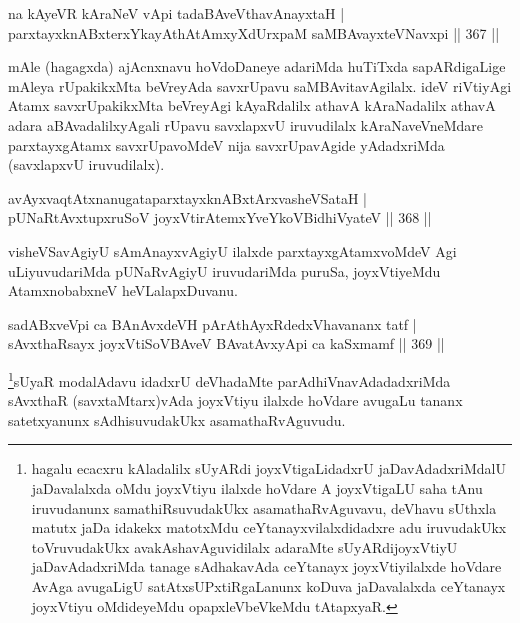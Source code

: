 \begin{shl}
na kAyeVR kAraNeV vA\s pi tadaBAveV\s thavA\s nayxtaH | \\
parxtayxknABxterxYkayAthAtAmxyXdUrxpaM saMBAvayxteV\s Navxpi \hfill||  367 ||  
\end{shl}

\begin{artha}
mAle (hagagxda) ajAcnxnavu hoVdoDaneye adariMda huTiTxda sapARdigaLige mAleya rUpakikxMta beVreyAda savxrUpavu saMBAvitavAgilalx. ideV riVtiyAgi Atamx savxrUpakikxMta beVreyAgi kAyaRdalilx athavA kAraNadalilx athavA adara aBAvadalilxyAgali rUpavu savxlapxvU iruvudilalx kAraNaveVneMdare parxtayxgAtamx savxrUpavoMdeV nija savxrUpavAgide yAdadxriMda (savxlapxvU iruvudilalx).
\end{artha}

\begin{shl}
avAyxvaqtAtxnanugataparxtayxknABxtArxvasheVSataH | \\
pUNaRtAvxtupxruSoV joyxVtirAtemxYveYkoV\s BidhiVyateV \hfill||  368 || 
\end{shl}

\begin{artha}
visheVSavAgiyU sAmAnayxvAgiyU ilalxde parxtayxgAtamxvoMdeV Agi uLiyuvudariMda pUNaRvAgiyU iruvudariMda puruSa, joyxVtiyeMdu AtamxnobabxneV heVLalapxDuvanu.
\end{artha}

\begin{shl}
sadABxveV\s pi ca BAnAvxdeVH pArAthAyxRdedxVhavananx tatf | \\
sAvxthaRsayx joyxVtiSoV\s BAveV BAvatAvxyApi ca kaSxmamf \hfill||  369 ||  
\end{shl}

\begin{artha}
\footnote{hagalu ecacxru kAladalilx sUyARdi joyxVtigaLidadxrU jaDavAdadxriMdalU jaDavalalxda oMdu joyxVtiyu ilalxde hoVdare A joyxVtigaLU saha tAnu iruvudanunx samathiRsuvudakUkx asamathaRvAguvavu, deVhavu sUthxla matutx jaDa idakekx matotxMdu ceYtanayxvilalxdidadxre adu iruvudakUkx toVruvudakUkx avakAshavAguvidilalx adaraMte sUyARdijoyxVtiyU jaDavAdadxriMda tanage sAdhakavAda ceYtanayx joyxVtiyilalxde hoVdare AvAga avugaLigU satAtxsUPxtiRgaLanunx koDuva jaDavalalxda ceYtanayx joyxVtiyu oMdideyeMdu opapxleVbeVkeMdu tAtapxyaR.}sUyaR modalAdavu idadxrU deVhadaMte parAdhiVnavAdadadxriMda sAvxthaR (savxtaMtarx)vAda joyxVtiyu ilalxde hoVdare avugaLu tananx satetxyanunx sAdhisuvudakUkx asamathaRvAguvudu.
\end{artha}

